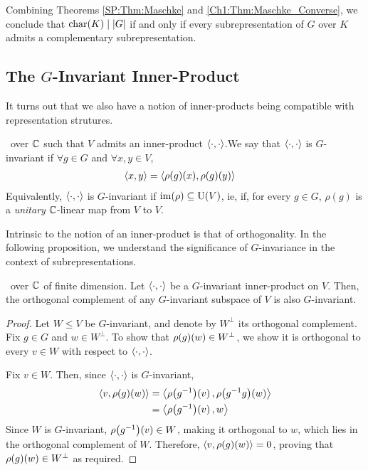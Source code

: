 Combining Theorems \ref{SP:Thm:Maschke} and \ref{Ch1:Thm:Maschke_Converse}, we conclude that $\operatorname{char}\!\left( K \right) \mid \left\lvert G \right\rvert$ if and only if every subrepresentation of $G$ over $K$ admits a complementary subrepresentation.

\subsection{The $G$-Invariant Inner-Product}

It turns out that we also have a notion of inner-products being compatible with representation strutures.

\begin{boxdefinition}
    \ over $\mathbb{C}$ such that $V$ admits an inner-product $\left\langle \cdot, \cdot \right\rangle$.We say that $\left\langle \cdot, \cdot \right\rangle$ is $G$-invariant if $\forall g \in G$ and $\forall x, y \in V$,
    \begin{align*}
        \left\langle x,y \right\rangle &= \left\langle \rho(g)(x), \rho(g)(y) \right\rangle
    \end{align*}
    Equivalently, $\left\langle \cdot, \cdot \right\rangle$ is $G$-invariant if $\operatorname{im}\!\left( \rho \right) \subseteq \operatorname{U}\!\left( V \right)$, ie, if, for every $g \in G$, $\rho(g)$ is a \textit{unitary} $\mathbb{C}$-linear map from $V$ to $V$.
\end{boxdefinition}

Intrinsic to the notion of an inner-product is that of orthogonality. In the following proposition, we understand the significance of $G$-invariance in the context of subrepresentations.

\begin{proposition} \label{Ch1:Prop:Orth_Compl_of_Inv_Inv}
    \ over $\mathbb{C}$ of finite dimension. Let $\left\langle \cdot, \cdot \right\rangle$ be a $G$-invariant inner-product on $V$. Then, the orthogonal complement of any $G$-invariant subspace of $V$ is also $G$-invariant.
\end{proposition}
\begin{proof}
    Let $W \leq V$ be $G$-invariant, and denote by $W^\perp$ its orthogonal complement. Fix $g \in G$ and $w \in W^\perp$. To show that $\rho\!\left( g \right)\!\left( w \right) \in W^\perp$, we show it is orthogonal to every $v \in W$ with respect to $\left\langle \cdot, \cdot \right\rangle$.

    Fix $v \in W$. Then, since $\left\langle \cdot, \cdot \right\rangle$ is $G$-invariant,
    \begin{align*}
        \cycl{v, \rhoff{g}{w}} &= \cycl{\rhoff{g\inv}{v}, \rhoff{g\inv g}{w}} \\
        &= \cycl{\rhoff{g\inv}{v}, w}
    \end{align*}
    Since $W$ is $G$-invariant, $\rho\!\left( g^{-1} \right)\!\left( v \right) \in W$, making it orthogonal to $w$, which lies in the orthogonal complement of $W$. Therefore, $\left\langle v, \rho\!\left( g \right)\!\left( w \right) \right\rangle = 0$, proving that $\rho\!\left( g \right)\!\left( w \right) \in W^\perp$ as required.
\end{proof}

